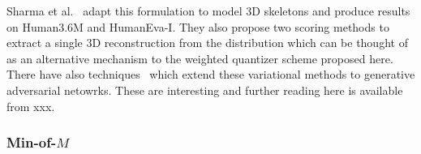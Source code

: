 




Sharma et al.~\cite{xxx} adapt this formulation to model 3D skeletons and produce results on Human3.6M and HumanEva-I. They also propose two scoring methods to extract a single 3D reconstruction from the distribution which can be thought of as an alternative mechanism to the weighted quantizer scheme proposed here. There have also techniques~\cite{xxx} which extend these variational methods to generative adversarial netowrks. These are interesting and further reading here is available from xxx. 








\subsubsection{Min-of-$M$}

